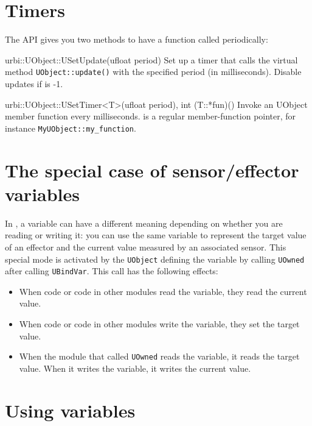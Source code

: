 \section{Timers}
\label{sec:uob:timers}

The API gives you two methods to have a function called periodically:
\begin{cxxapi}
\item[urbi::UObject::USetUpdate(ufloat period)]
  Set up a timer that calls the virtual method
  \lstinline{UObject::update()} with the specified period (in
  milliseconds).  Disable updates if  is -1.

\item[urbi::UObject::USetTimer<T>(ufloat period), int (T::*fun)()]
  Invoke an UObject member function  every 
  milliseconds.   is a regular member-function pointer, for
  instance \lstinline|MyUObject::my_function|.
\end{cxxapi}

\section{The special case of sensor/effector variables}

In \urbi, a variable can have a different meaning depending on whether
you are reading or writing it: you can use the same variable to
represent the target value of an effector and the current value
measured by an associated sensor. This special mode is activated by
the \lstinline{UObject} defining the variable by calling
\lstinline{UOwned} after calling \lstinline{UBindVar}. This call has
the following effects:
\begin{itemize}
\item When \urbi code or code in other modules read the variable, they
  read the current value.
\item When \urbi code or code in other modules write the variable,
  they set the target value.
\item When the module that called \lstinline|UOwned| reads the
  variable, it reads the target value. When it writes the variable, it
  writes the current value.
\end{itemize}

\section{Using \urbi variables}

